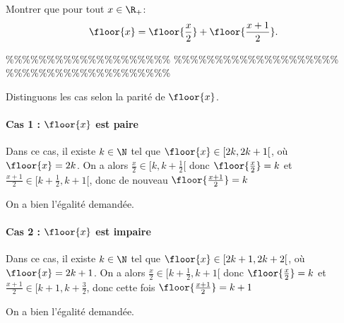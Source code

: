 



\begin{exercice} 
Montrer que pour tout $x\in \R_+$:
$$\floor{x} =\floor{\frac{x}{2} } +\floor{\frac{x+1}{2} }.$$

\end{exercice}


\%\%\%\%\%\%\%\%\%\%\%\%\%\%\%\%\%\%\%\%
\%\%\%\%\%\%\%\%\%\%\%\%\%\%\%\%\%\%\%\%
\%\%\%\%\%\%\%\%\%\%\%\%\%\%\%\%\%\%\%\%




\begin{correction}
Distinguons les cas selon la parité de $\floor{x}$. 
\paragraph{Cas 1 : $\floor{x}$ est paire}
Dans ce cas, il existe $k\in \N$ tel que $\floor{x} \in [2k,2k+1[$, où $\floor{x}=2k$. On a alors 
$\frac{x}{2}\in [k,k+\frac{1}{2}[$ donc $\floor{\frac{x}{2}} =k$
et $\frac{x+1}{2 }\in [k+\frac{1}{2}, k+1[$, donc de nouveau $\floor{\frac{x+1}{2 }}=k$

On a bien l'égalité demandée. 

\paragraph{Cas 2 : $\floor{x}$ est impaire}
Dans ce cas, il existe $k\in \N$ tel que $\floor{x} \in [2k+1,2k+2[$, où $\floor{x}=2k+1$.  On a alors 
$\frac{x}{2}\in [k+\frac{1}{2},k+1[$ donc $\floor{\frac{x}{2}} =k$
et $\frac{x+1}{2 }\in [k+1, k+\frac{3}{2}$, donc cette fois $\floor{\frac{x+1}{2 }}=k+1$

On a bien l'égalité demandée. 


\end{correction}